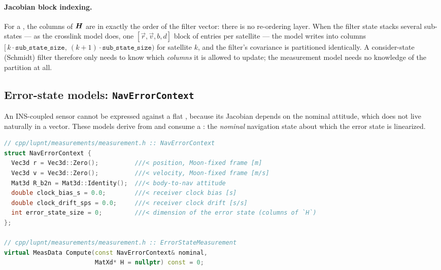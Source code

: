 \paragraph{Jacobian block indexing.} For a , the columns of
$\bm{H}$ are in exactly the order of the filter  vector: there is
no re-ordering layer. When the filter state stacks several sub-states --- as
the crosslink model does, one $[\vec{r}, \vec{v}, b, d]$ block of
 entries per satellite --- the model writes into columns
$[\,k\cdot\texttt{sub\_state\_size},\ (k{+}1)\cdot\texttt{sub\_state\_size})$
for satellite $k$, and the filter's covariance is partitioned identically. A
consider-state (Schmidt) filter therefore only needs to know which
\emph{columns} it is allowed to update; the measurement model needs no
knowledge of the partition at all.

\subsection{Error-state models: \texttt{NavErrorContext}}
\label{sec:meas-navcontext}

An INS-coupled sensor cannot be expressed against a flat , because
its Jacobian depends on the nominal attitude, which does not live naturally in
a vector. These models derive from  and consume a
: the \emph{nominal} navigation state about which the
error state is linearized.

\begin{lstlisting}[language=cpp, caption={The nominal navigation state an
  error-state model linearizes about.}, label={lst:meas-navcontext}]
// cpp/lupnt/measurements/measurement.h :: NavErrorContext
struct NavErrorContext {
  Vec3d r = Vec3d::Zero();          ///< position, Moon-fixed frame [m]
  Vec3d v = Vec3d::Zero();          ///< velocity, Moon-fixed frame [m/s]
  Mat3d R_b2n = Mat3d::Identity();  ///< body-to-nav attitude
  double clock_bias_s = 0.0;        ///< receiver clock bias [s]
  double clock_drift_sps = 0.0;     ///< receiver clock drift [s/s]
  int error_state_size = 0;         ///< dimension of the error state (columns of `H`)
};

// cpp/lupnt/measurements/measurement.h :: ErrorStateMeasurement
virtual MeasData Compute(const NavErrorContext& nominal,
                         MatXd* H = nullptr) const = 0;
\end{lstlisting}

